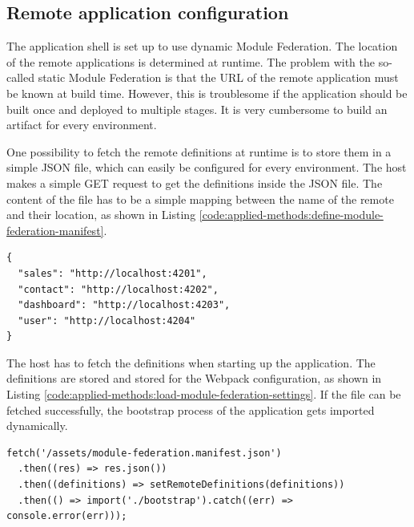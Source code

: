 \subsection{Remote application configuration}\label{subsection:applied-methods:prototypical-implementation
:load-remote-settings}

The application shell is set up to use dynamic Module Federation. The location of the remote applications is determined at runtime. The problem with the so-called static Module Federation is that the \ac{URL} of the remote application must be known at build time. However, this is troublesome if the application should be built once and deployed to multiple stages. It is very cumbersome to build an artifact for every environment.

\bigskip

\noindent One possibility to fetch the remote definitions at runtime is to store them in a simple \ac{JSON} file, which can easily be configured for every environment. The host makes a simple GET request to get the definitions inside the \ac{JSON} file. The content of the file has to be a simple mapping between the name of the remote and their location, as shown in Listing \ref{code:applied-methods:define-module-federation-manifest}.

\ifshowListings
\begin{listing}[H]
\begin{verbatim}
{
  "sales": "http://localhost:4201",
  "contact": "http://localhost:4202",
  "dashboard": "http://localhost:4203",
  "user": "http://localhost:4204"
}
\end{verbatim}
\caption{Loading micro-frontend \acp{URL} during startup.}\label{code:applied-methods:define-module-federation-manifest}
\end{listing}
\fi

\noindent The host has to fetch the definitions when starting up the application. The definitions are stored and stored for the Webpack configuration, as shown in Listing \ref{code:applied-methods:load-module-federation-settings}. If the file can be fetched successfully, the bootstrap process of the application gets imported dynamically.

\ifshowListings
\begin{listing}[H]
\begin{verbatim}
fetch('/assets/module-federation.manifest.json')
  .then((res) => res.json())
  .then((definitions) => setRemoteDefinitions(definitions))
  .then(() => import('./bootstrap').catch((err) => console.error(err)));
\end{verbatim}
\caption{Loading micro-frontend \acp{URL} during initialization.}\label{code:applied-methods:load-module-federation-settings}
\end{listing}
\fi

